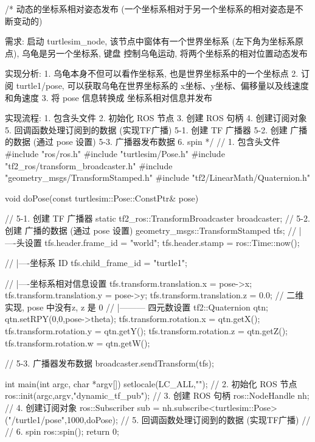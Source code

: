 \documentclass[openany, fontset=windowsold]{ctexbook}
\theoremstyle{kaiti}
\theoremstyle{normal}
\begin{document}
\begin{cpp}
  /*  
      动态的坐标系相对姿态发布 (一个坐标系相对于另一个坐标系的相对姿态是不断变动的)

      需求: 启动 turtlesim_node, 该节点中窗体有一个世界坐标系 (左下角为坐标系原点), 乌龟是另一个坐标系, 键盘
      控制乌龟运动, 将两个坐标系的相对位置动态发布

      实现分析:
          1. 乌龟本身不但可以看作坐标系, 也是世界坐标系中的一个坐标点
          2. 订阅 turtle1/pose, 可以获取乌龟在世界坐标系的 x坐标、y坐标、偏移量以及线速度和角速度
          3. 将 pose 信息转换成 坐标系相对信息并发布

      实现流程:
          1. 包含头文件
          2. 初始化 ROS 节点
          3. 创建 ROS 句柄
          4. 创建订阅对象
          5. 回调函数处理订阅到的数据 (实现TF广播)
              5-1. 创建 TF 广播器
              5-2. 创建 广播的数据 (通过 pose 设置)
              5-3. 广播器发布数据
          6. spin
  */
  // 1. 包含头文件
  #include "ros/ros.h"
  #include "turtlesim/Pose.h"
  #include "tf2_ros/transform_broadcaster.h"
  #include "geometry_msgs/TransformStamped.h"
  #include "tf2/LinearMath/Quaternion.h"

  void doPose(const turtlesim::Pose::ConstPtr& pose){
      //  5-1. 创建 TF 广播器
      static tf2_ros::TransformBroadcaster broadcaster;
      //  5-2. 创建 广播的数据 (通过 pose 设置)
      geometry_msgs::TransformStamped tfs;
      //  |----头设置
      tfs.header.frame_id = "world";
      tfs.header.stamp = ros::Time::now();

      //  |----坐标系 ID
      tfs.child_frame_id = "turtle1";

      //  |----坐标系相对信息设置
      tfs.transform.translation.x = pose->x;
      tfs.transform.translation.y = pose->y;
      tfs.transform.translation.z = 0.0; // 二维实现, pose 中没有z, z 是 0
      //  |--------- 四元数设置
      tf2::Quaternion qtn;
      qtn.setRPY(0,0,pose->theta);
      tfs.transform.rotation.x = qtn.getX();
      tfs.transform.rotation.y = qtn.getY();
      tfs.transform.rotation.z = qtn.getZ();
      tfs.transform.rotation.w = qtn.getW();

      //  5-3. 广播器发布数据
      broadcaster.sendTransform(tfs);
  }

  int main(int argc, char *argv[])
  {
      setlocale(LC_ALL,"");
      // 2. 初始化 ROS 节点
      ros::init(argc,argv,"dynamic_tf_pub");
      // 3. 创建 ROS 句柄
      ros::NodeHandle nh;
      // 4. 创建订阅对象
      ros::Subscriber sub = nh.subscribe<turtlesim::Pose>("/turtle1/pose",1000,doPose);
      //     5. 回调函数处理订阅到的数据 (实现TF广播)
      //        
      // 6. spin
      ros::spin();
      return 0;
  }
\end{cpp}
\end{document}
